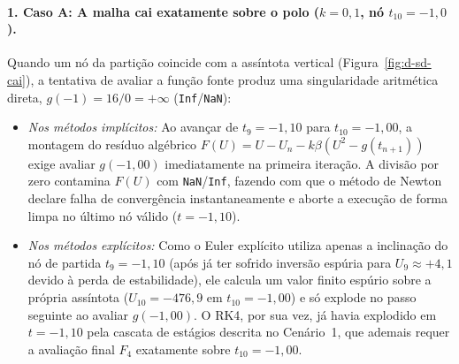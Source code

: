 \documentclass[12pt, a4paper]{article}
\begin{document}
\paragraph{1. Caso A: A malha cai exatamente sobre o polo ($k = 0{,}1$, nó $t_{10} = -1{,}0$).}
Quando um nó da partição coincide com a assíntota vertical (Figura~\ref{fig:d-sd-cai}), a tentativa de avaliar a função fonte produz uma singularidade aritmética direta, $g(-1) = 16/0 = +\infty$ (\texttt{Inf}/\texttt{NaN}):
\begin{itemize}
    \item \emph{Nos métodos implícitos:} Ao avançar de $t_9 = -1{,}10$ para $t_{10} = -1{,}00$, a montagem do resíduo algébrico $F(U) = U - U_n - k\beta(U^2 - g(t_{n+1}))$ exige avaliar $g(-1{,}00)$ imediatamente na primeira iteração. A divisão por zero contamina $F(U)$ com \texttt{NaN}/\texttt{Inf}, fazendo com que o método de Newton declare falha de convergência instantaneamente e aborte a execução de forma limpa no último nó válido ($t = -1{,}10$).
    \item \emph{Nos métodos explícitos:} Como o Euler explícito utiliza apenas a inclinação do nó de partida $t_9 = -1{,}10$ (após já ter sofrido inversão espúria para $U_9 \approx +4{,}1$ devido à perda de estabilidade), ele calcula um valor finito espúrio sobre a própria assíntota ($U_{10} = -476{,}9$ em $t_{10} = -1{,}00$) e só explode no passo seguinte ao avaliar $g(-1{,}00)$. O RK4, por sua vez, já havia explodido em $t = -1{,}10$ pela cascata de estágios descrita no Cenário~1, que ademais requer a avaliação final $F_4$ exatamente sobre $t_{10} = -1{,}00$.
\end{itemize}
\end{document}
